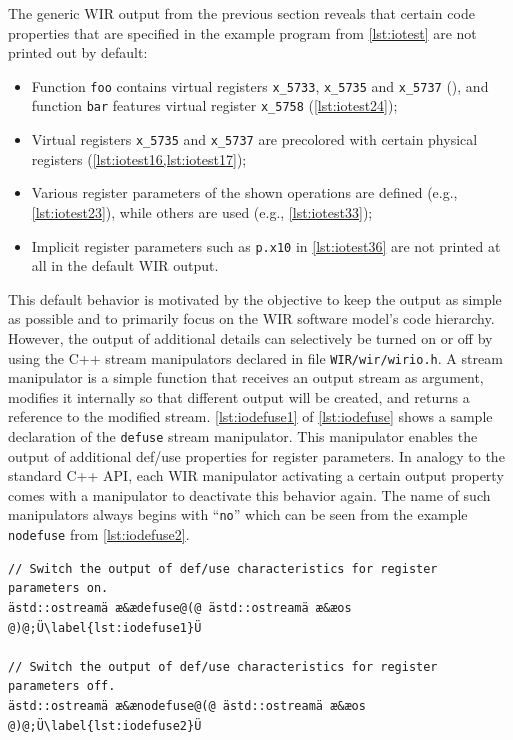 The generic \gls{WIR} output from the previous section reveals that certain code properties that are specified in the example program from \cref{lst:iotest} are not printed out by default:
\begin{itemize}
  \item Function \texttt{foo} contains virtual registers \texttt{x\_5733}, \texttt{x\_5735} and \texttt{x\_5737} (), and function \texttt{bar} features virtual register \texttt{x\_5758} (\cref{lst:iotest24});
  \item Virtual registers \texttt{x\_5735} and \texttt{x\_5737} are precolored with certain physical registers (\cref{lst:iotest16,lst:iotest17});
  \item Various register parameters of the shown operations are defined (e.g., \cref{lst:iotest23}), while others are used (e.g., \cref{lst:iotest33});
  \item Implicit register parameters such as \texttt{p.x10} in \cref{lst:iotest36} are not printed at all in the default \gls{WIR} output.
\end{itemize}
This default behavior is motivated by the objective to keep the output as simple as possible and to primarily focus on the \gls{WIR} software model's code hierarchy.
However, the output of additional details can selectively be turned on or off by using the C++ stream manipulators declared in file \texttt{WIR/wir/wirio.h}.
A stream manipulator is a simple function that receives an output stream as argument, modifies it internally so that different output will be created, and returns a reference to the modified stream.
\cref{lst:iodefuse1} of \cref{lst:iodefuse} shows a sample declaration of the \texttt{defuse} stream manipulator.
This manipulator enables the output of additional def/use properties for register parameters.
In analogy to the standard C++ \gls{API}, each \gls{WIR} manipulator activating a certain output property comes with a manipulator to deactivate this behavior again.
The name of such manipulators always begins with ``\texttt{no}'' which can be seen from the example \texttt{nodefuse} from \cref{lst:iodefuse2}.

\begin{lstlisting}[style=code,float=h,caption={Declaration of \texttt{defuse} and \texttt{nodefuse} Stream Manipulators in file \texttt{wirio.h}},label=lst:iodefuse]
// Switch the output of def/use characteristics for register parameters on.
ästd::ostreamä æ&ædefuse@(@ ästd::ostreamä æ&æos @)@;Ü\label{lst:iodefuse1}Ü

// Switch the output of def/use characteristics for register parameters off.
ästd::ostreamä æ&ænodefuse@(@ ästd::ostreamä æ&æos @)@;Ü\label{lst:iodefuse2}Ü
\end{lstlisting}

